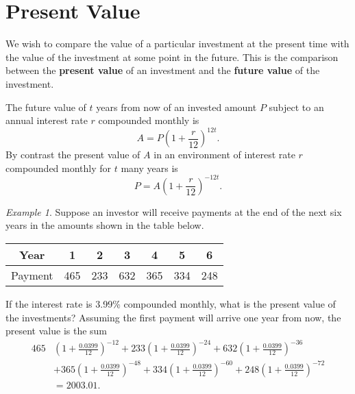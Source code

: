 \documentclass[leqno]{article}
\theoremstyle{definition}
\theoremstyle{remark}
\newtheorem{example}{Example}[section]
\begin{document}
\section{Present Value}
    We wish to compare the value of a particular investment at the present time with the value of the investment at some point in the future. This is the comparison between the \textbf{present value} of an investment and the \textbf{future value} of the investment.\par The future value of  $t$ years from now of an invested amount $P$ subject to an annual interest rate $r$ compounded monthly is
        \begin{equation}
            A=P\left(1+\frac{r}{12}\right)^{12t}.
        \end{equation}
    By contrast the present value of $A$ in an environment of interest rate $r$ compounded monthly for $t$ many years is
        \begin{equation}
            P=A\left(1+\frac{r}{12}\right)^{-12t}.
        \end{equation}
    \begin{example}
        Suppose an investor will receive payments at the end of the next six years in the amounts shown in the table below.
            \begin{table}[htc]
                \centering
                \begin{tabular}{|c|c|c|c|c|c|c|}
                \hline
                    Year    & 1   & 2   & 3   & 4   & 5   & 6   \\ \hline
                    Payment & 465 & 233 & 632 & 365 & 334 & 248 \\ \hline
                \end{tabular}
            \end{table}\hfill\par
        If the interest rate is 3.99\% compounded monthly, what is the present value of the investments? Assuming the first payment will arrive one year from now, the present value is the sum
            \begin{equation*}
                \begin{split}
                    465&\left(1+\frac{0.0399}{12}\right)^{-12}+233\left(1+\frac{0.0399}{12}\right)^{-24}+632\left(1+\frac{0.0399}{12}\right)^{-36} \\ &+365\left(1+\frac{0.0399}{12}\right)^{-48}+334\left(1+\frac{0.0399}{12}\right)^{-60}+248\left(1+\frac{0.0399}{12}\right)^{-72} \\
                    &=2003.01.
                \end{split}
            \end{equation*}
    \end{example}
\end{document}
